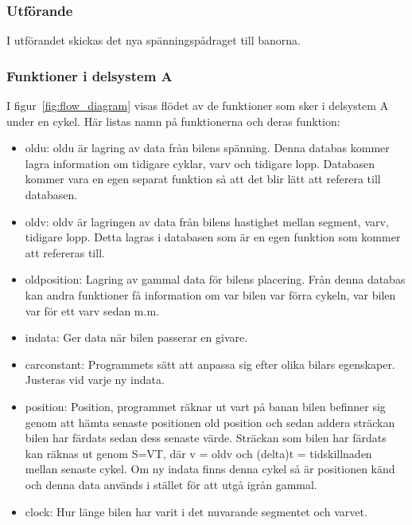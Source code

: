     \subsubsection{Utförande}

    I utförandet skickas det nya spänningspådraget till banorna. 
	

    \subsubsection{Funktioner i delsystem A} \label{sec:system_a_funcs}
    I figur~\ref{fig:flow_diagram}  visas flödet av de funktioner som sker i delsystem A under en cykel.
    Här listas namn på funktionerna och deras funktion:
    \begin{itemize}
	\item old\textunderscore u: old\textunderscore u är lagring av data från bilens spänning. Denna databas kommer lagra information om tidigare cyklar, varv och tidigare lopp. Databasen kommer vara en egen separat funktion så att det blir lätt att referera till databasen.
	\item old\textunderscore v: old\textunderscore v är lagringen av data från bilens hastighet mellan segment, varv, tidigare lopp. Detta lagras i databasen som är en egen funktion som kommer att refereras till. 
	\item old\textunderscore position: Lagring av gammal data för bilens placering. Från denna databas kan andra funktioner få information om var bilen var förra cykeln, var bilen var för ett varv sedan m.m.
      \item indata: Ger data när bilen passerar en givare.
      \item car\textunderscore constant: Programmets sätt att anpassa sig efter olika bilars egenskaper. Justeras vid varje ny indata.
      \item position: Position, programmet räknar ut vart på banan bilen befinner sig genom att hämta senaste positionen old position och sedan addera sträckan bilen har färdats sedan dess senaste värde. Sträckan som bilen har färdats kan räknas ut genom S=V\textasteriskcentered T, där v = old\textunderscore v och (delta)t = tidskillnaden mellan senaste cykel. Om ny indata finns denna cykel så är positionen känd och denna data används i stället för att utgå igrån gammal.
      \item clock: Hur länge bilen har varit i det nuvarande segmentet och varvet.


\end{itemize}

